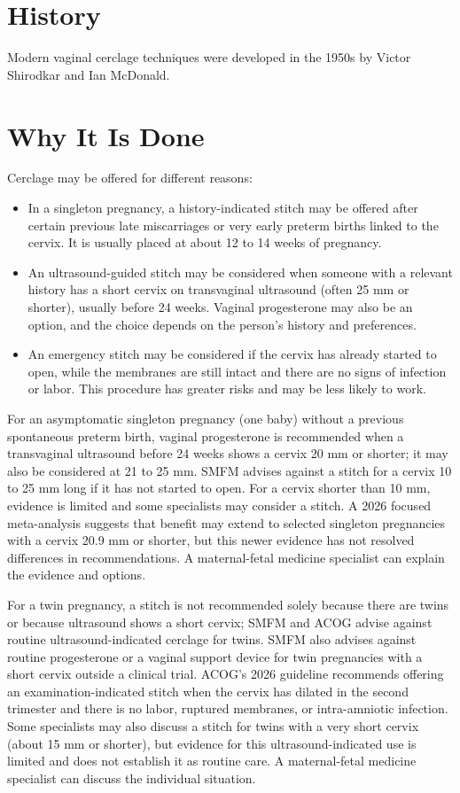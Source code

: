 \section*{History}
Modern vaginal cerclage techniques were developed in the 1950s by Victor Shirodkar and Ian McDonald.

\section*{Why It Is Done}
Cerclage may be offered for different reasons:
\begin{itemize}
  \item In a singleton pregnancy, a history-indicated stitch may be offered after certain previous late miscarriages or very early preterm births linked to the cervix. It is usually placed at about 12 to 14 weeks of pregnancy.
  \item An ultrasound-guided stitch may be considered when someone with a relevant history has a short cervix on transvaginal ultrasound (often 25 mm or shorter), usually before 24 weeks. Vaginal progesterone may also be an option, and the choice depends on the person's history and preferences.
  \item An emergency stitch may be considered if the cervix has already started to open, while the membranes are still intact and there are no signs of infection or labor. This procedure has greater risks and may be less likely to work.
\end{itemize}

For an asymptomatic singleton pregnancy (one baby) without a previous spontaneous preterm birth, vaginal progesterone is recommended when a transvaginal ultrasound before 24 weeks shows a cervix 20 mm or shorter; it may also be considered at 21 to 25 mm. SMFM advises against a stitch for a cervix 10 to 25 mm long if it has not started to open. For a cervix shorter than 10 mm, evidence is limited and some specialists may consider a stitch. A 2026 focused meta-analysis suggests that benefit may extend to selected singleton pregnancies with a cervix 20.9 mm or shorter, but this newer evidence has not resolved differences in recommendations. A maternal-fetal medicine specialist can explain the evidence and options.

For a twin pregnancy, a stitch is not recommended solely because there are twins or because ultrasound shows a short cervix; SMFM and ACOG advise against routine ultrasound-indicated cerclage for twins. SMFM also advises against routine progesterone or a vaginal support device for twin pregnancies with a short cervix outside a clinical trial. ACOG's 2026 guideline recommends offering an examination-indicated stitch when the cervix has dilated in the second trimester and there is no labor, ruptured membranes, or intra-amniotic infection. Some specialists may also discuss a stitch for twins with a very short cervix (about 15 mm or shorter), but evidence for this ultrasound-indicated use is limited and does not establish it as routine care. A maternal-fetal medicine specialist can discuss the individual situation.

